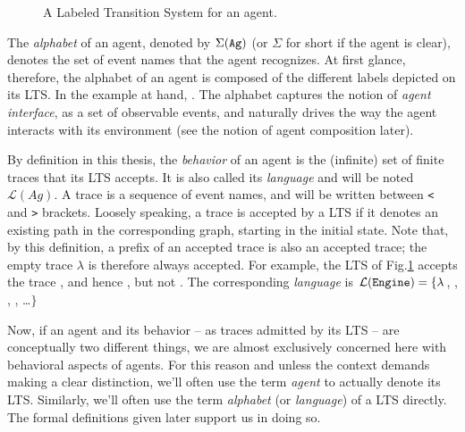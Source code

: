 \begin{figure}[H]
\centering{}
  \caption{A Labeled Transition System for an  agent\label{image:framework-start-stop}.}
\end{figure}

The \emph{alphabet} of an agent, denoted by $\Sigma(\texttt{Ag})$ (or $\Sigma$ for short if the agent is clear),  denotes the set of event names that the agent recognizes. At first glance, therefore, the alphabet of an agent is composed of the different labels depicted on its LTS. In the example at hand, . The alphabet captures the notion of \emph{agent interface}, as a set of observable events, and naturally drives the way the agent interacts with its environment (see the notion of agent composition later).

By definition in this thesis, the \emph{behavior} of an agent is the (infinite) set of finite traces that its LTS accepts. It is also called its \emph{language} and will be noted $\mathcal{L}(Ag)$. A trace is a sequence of event names, and will be written between \verb|<| and \verb|>| brackets. Loosely speaking, a trace is accepted by a LTS if it denotes an existing path in the corresponding graph, starting in the initial state. Note that, by this definition, a prefix of an accepted trace is also an accepted trace; the empty trace $\lambda$ is therefore always accepted. For example, the LTS of Fig.\ref{image:framework-start-stop} accepts the trace , and hence , but not . The corresponding \emph{language} is $\mathcal{L}(\texttt{Engine})=\{\lambda$, , , , \ldots $\}$

Now, if an agent and its behavior -- as traces admitted by its LTS -- are conceptually two different things, we are almost exclusively concerned here with behavioral aspects of agents. For this reason and unless the context demands making a clear distinction, we'll often use the term \emph{agent} to actually denote its LTS. Similarly, we'll often use the term \emph{alphabet} (or \emph{language}) of a LTS directly. The formal definitions given later support us in doing so.

